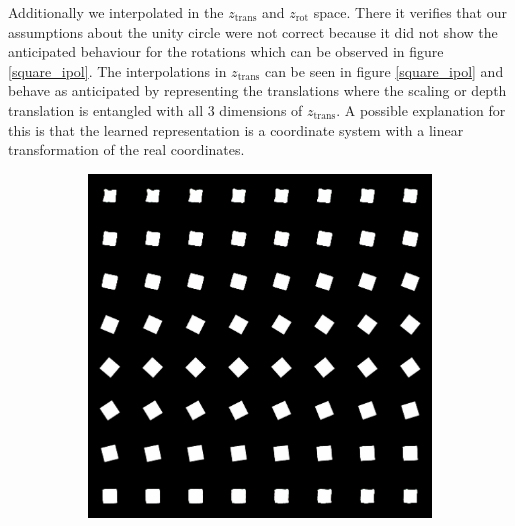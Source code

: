 \documentclass[10pt,a4paper]{article}
\newcommand{\rot}{\ensuremath{\text{rot}\xspace}}
\newcommand{\trans}{\ensuremath{\text{trans}\xspace}}
\begin{document}
Additionally we interpolated in the $z_{\trans}$ and $z_{\rot}$ space. There it verifies that our assumptions about the unity circle were not correct because it did not show the anticipated behaviour for the rotations which can be observed in figure \ref{square_ipol}.
The interpolations in $z_{\trans}$ can be seen in figure \ref{square_ipol} and behave as anticipated by representing the translations where the scaling or depth translation is entangled with all 3 dimensions of $z_{\trans}$. A possible explanation for this is that the learned representation is a coordinate system with a linear transformation of the real coordinates.\\  
\begin{figure}[!ht]
    \centering
    \begin{subfigure}{0.49\textwidth}
        \centering
        \includegraphics[width=\textwidth] {square_interpolation_theta.png}
        \caption{}
        \label{fig1:subim1}
    \end{subfigure}
    \begin{subfigure}{0.49\textwidth}
        \centering	

\end{subfigure}
\end{figure}
\end{document}
